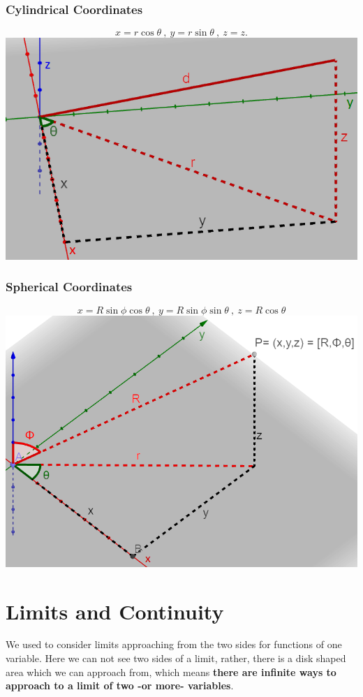 \documentclass[12pt]{article}
\begin{document}
\subsubsection{Cylindrical Coordinates}
$$x=r \cos \theta \ ,\ y= r \sin \theta \ ,\ z=z.$$
\includegraphics[scale=0.8]{cylindr_co.png}

\newpage
\subsubsection{Spherical Coordinates}
$$x=R\sin \phi \cos \theta \ , \ y=R \sin \phi \sin \theta \ , \ z=R \cos \theta$$
\includegraphics[scale=0.65]{spherical_co.png}

\newpage
\section{Limits and Continuity}
We used to consider limits approaching from the two sides for functions of one variable. Here we can not see two sides of a limit, rather, there is a disk shaped area which we can approach from, which means \textbf{there are infinite ways to approach to a limit of two -or more- variables}.
\end{document}
